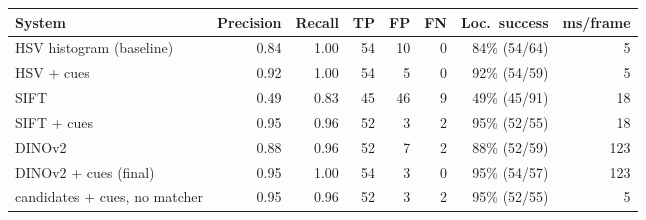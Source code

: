\begin{tabular}{lrrrrrrr}
\toprule
System & Precision & Recall & TP & FP & FN & Loc.\ success & ms/frame \\
\midrule
HSV histogram (baseline) & 0.84 & 1.00 & 54 & 10 & 0 & 84\% (54/64) & 5 \\
HSV + cues & 0.92 & 1.00 & 54 & 5 & 0 & 92\% (54/59) & 5 \\
SIFT & 0.49 & 0.83 & 45 & 46 & 9 & 49\% (45/91) & 18 \\
SIFT + cues & 0.95 & 0.96 & 52 & 3 & 2 & 95\% (52/55) & 18 \\
DINOv2 & 0.88 & 0.96 & 52 & 7 & 2 & 88\% (52/59) & 123 \\
DINOv2 + cues (final) & 0.95 & 1.00 & 54 & 3 & 0 & 95\% (54/57) & 123 \\
candidates + cues, no matcher & 0.95 & 0.96 & 52 & 3 & 2 & 95\% (52/55) & 5 \\
\bottomrule
\end{tabular}
